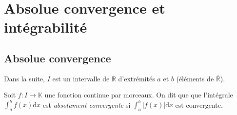 \documentclass[french,11pt,twoside]{VcCours}
\newcommand{\dx}{\text{d}x}
\newcommand{\dt}{\text{d}t}
\begin{document}
%
%
%
%

\section{Absolue convergence et intégrabilité}

\subsection{Absolue convergence}

Dans la suite, $I$ est un intervalle de $\mathbb{R}$ d'extrémités $a$ et $b$ (éléments de $\overline{\mathbb{R}}$).

\begin{Definition}{} Soit $f : I \rightarrow \mathbb{K}$ une fonction continue par morceaux. On dit que que l'intégrale $\int_{a}^b f(x) \dx$ est \emph{absolument convergente} si $\int_{a}^b \vert f(x) \vert \dx$ est convergente.
\end{Definition}
\end{document}
